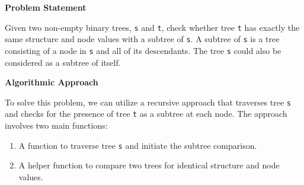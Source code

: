 

\textbf{Problem Statement}

Given two non-empty binary trees, \texttt{s} and \texttt{t}, check whether tree \texttt{t} has exactly the same structure and node values with a subtree of \texttt{s}. A subtree of \texttt{s} is a tree consisting of a node in \texttt{s} and all of its descendants. The tree \texttt{s} could also be considered as a subtree of itself.

\textbf{Algorithmic Approach}

To solve this problem, we can utilize a recursive approach that traverses tree \texttt{s} and checks for the presence of tree \texttt{t} as a subtree at each node. The approach involves two main functions:
\begin{enumerate}
    \item A function to traverse tree \texttt{s} and initiate the subtree comparison.
    \item A helper function to compare two trees for identical structure and node values.
\end{enumerate}

